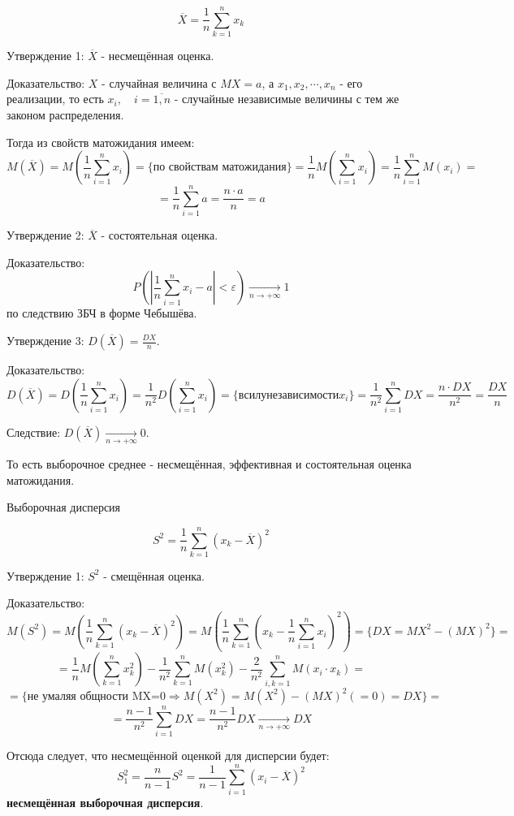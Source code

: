 \documentclass[12pt, a4paper]{article}
\begin{document}
\[\overline{X} = \frac{1}{n} \sum_{k=1}^n x_k \]

Утверждение 1: $\overline{X}$ - несмещённая оценка.

Доказательство: $X$ - случайная величина с $MX = a$, а $x_1, x_2, \cdots, x_n$ - его реализации, то есть $x_i, \quad i = \overline{1, n}$ - случайные независимые величины с тем же законом распределения.

Тогда из свойств матожидания имеем:
\[M(\overline{X}) = M(\frac{1}{n} \sum_{i=1}^n x_i) = \{\textrm{по свойствам матожидания} \} = \frac{1}{n} M(\sum_{i=1}^n x_i) = \frac{1}{n} \sum_{i=1}^n M(x_i) = \]
\[= \frac{1}{n} \sum_{i=1}^n a = \frac{n \cdot a}{n} = a \]

Утверждение 2: $\overline{X}$ - состоятельная оценка.

Доказательство:
\[P(| \frac{1}{n} \sum_{i=1}^n x_i - a| < \varepsilon) \xrightarrow[n \to +\infty]{} 1\]
по следствию ЗБЧ в форме Чебышёва.

Утверждение 3: $D(\overline{X}) = \frac{DX}{n}$.

Доказательство:
\[D(\overline{X}) = D(\frac{1}{n} \sum_{i=1}^n x_i) = \frac{1}{n^2} D(\sum_{i=1}^n x_i) = \{в силу независимости x_i \} = \frac{1}{n^2} \sum_{i=1}^n DX = \frac{n \cdot DX}{n^2} = \frac{DX}{n} \]

Следствие: $D(\overline{X}) \xrightarrow[n \to +\infty]{} 0$.

То есть выборочное среднее - несмещённая, эффективная и состоятельная оценка матожидания.

\begin{center}
\begin{Large}
Выборочная дисперсия
\end{Large}
\end{center}

\[S^2 = \frac{1}{n} \sum_{k=1}^n (x_k - \overline{X})^2 \]

Утверждение 1: $S^2$ - смещённая оценка.

Доказательство:
\[M(S^2) = M(\frac{1}{n} \sum_{k=1}^n (x_k - \overline{X})^2) = M(\frac{1}{n} \sum_{k=1}^n (x_k - \frac{1}{n} \sum_{i=1}^n x_i)^2) = \{DX = MX^2 - (MX)^2 \} = \]
\[= \frac{1}{n} M(\sum_{k=1}^n x_k^2) - \frac{1}{n^2} \sum_{k=1}^n M(x_k^2) - \frac{2}{n^2} \sum_{i,k=1}^n M(x_i \cdot x_k) = \]
\[= \{\textrm{не умаляя общности MX=0} \Rightarrow M(X^2) = M(X^2) - (MX)^2 (=0) = DX \} = \]
\[= \frac{n-1}{n^2} \sum_{i=1}^n DX = \frac{n-1}{n^2} DX \xrightarrow[n \to +\infty]{} DX \]

Отсюда следует, что несмещённой оценкой для дисперсии будет:
\[S_1^2 = \frac{n}{n-1} S^2 = \frac{1}{n-1} \sum_{i=1}^n (x_i - \overline{X})^2 \]
\textbf{несмещённая выборочная дисперсия}.
\end{document}
